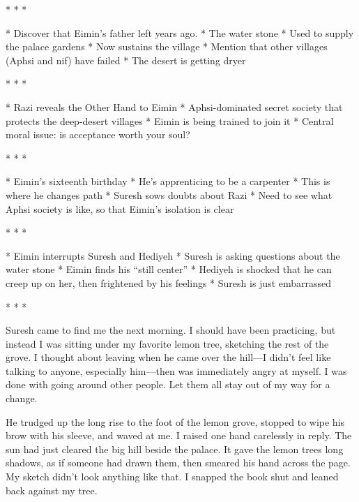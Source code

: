 \begin{center}* * *\end{center}

 * Discover that Eimin's father left years ago.
 * The water stone
  * Used to supply the palace gardens
  * Now sustains the village
 * Mention that other villages (Aphsi and nif) have failed
  * The desert is getting dryer

\begin{center}* * *\end{center}

 * Razi reveals the Other Hand to Eimin
  * Aphsi-dominated secret society that protects the deep-desert villages
  * Eimin is being trained to join it
 * Central moral issue: is acceptance worth your soul?

\begin{center}* * *\end{center}

 * Eimin's sixteenth birthday
   * He's apprenticing to be a carpenter
   * This is where he changes path
 * Suresh sows doubts about Razi
 * Need to see what Aphsi society is like, so that Eimin's isolation is clear

\begin{center}* * *\end{center}

 * Eimin interrupts Suresh and Hediyeh
  * Suresh is asking questions about the water stone
  * Eimin finds his ``still center''
  * Hediyeh is shocked that he can creep up on her, then frightened by his feelings
  * Suresh is just embarrassed

\begin{center}* * *\end{center}

Suresh came to find me the next morning.  I should have been
practicing, but instead I was sitting under my favorite lemon tree,
sketching the rest of the grove.  I thought about leaving when he came
over the hill---I didn't feel like talking to anyone, especially
him---then was immediately angry at myself.  I was done with going
around other people.  Let them all stay out of my way for a change.

He trudged up the long rise to the foot of the lemon grove, stopped to
wipe his brow with his sleeve, and waved at me.  I raised one hand
carelessly in reply.  The sun had just cleared the big hill beside the
palace.  It gave the lemon trees long shadows, as if someone had drawn
them, then smeared his hand across the page.  My sketch didn't look
anything like that.  I snapped the book shut and leaned back against
my tree.

